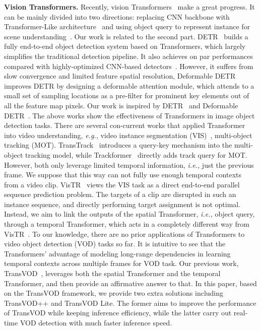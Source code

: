 \documentclass[10pt,journal,compsoc]{IEEEtran}
\begin{document}
\noindent
\textbf{Vision Transformers.} Recently, vision Transformers~\cite{detr,zhu2020deformable,liu2021swin, dosovitskiy2020image,sun2020transtrack,meinhardt2021trackformer} make a great progress. It can be mainly divided into two directions: replacing CNN backbone with Transformer-Like architecture~\cite{dosovitskiy2020image,liu2021swin,deit_vit,zhang2022eatformer} and using object query to represent instance for scene understanding~\cite{detr,zhu2020deformable,video_knet,panopticpartformer,fashionformer}. Our work is related to the second part. DETR~\cite{detr} builds a fully end-to-end object detection system based on Transformers, which largely simplifies the traditional detection pipeline. It also achieves on par performances compared with highly-optimized CNN-based detectors~\cite{ren2016faster}. However, it suffers from slow convergence and limited feature spatial resolution, Deformable DETR~\cite{zhu2020deformable} improves DETR by designing a deformable attention module, which attends to a small set of sampling locations as a pre-filter for prominent key elements out of all the feature map pixels. Our work is inspired by DETR~\cite{detr} and Deformable DETR~\cite{zhu2020deformable}. The above works show the effectiveness of Transformers in image object detection tasks. There are several con-current works that applied Transformer into video understanding, \emph{e.g.,} video instance segmentation (VIS)~\cite{vis_dataset}, multi-object tracking (MOT). TransTrack~\cite{sun2020transtrack} introduces a query-key mechanism into the multi-object tracking model, while Trackformer~\cite{meinhardt2021trackformer} directly adds track query for MOT. However, both only leverage limited temporal information, \emph{i.e.,} just the previous frame. We suppose that this way can not fully use enough temporal contexts from a video clip. VisTR~\cite{wang2020end} views the VIS task as a direct end-to-end parallel sequence prediction problem. The targets of a clip are disrupted in such an instance sequence, and directly performing target assignment is not optimal. Instead, we aim to link the outputs of the spatial Transformer, \emph{i.e.,} object query, through a temporal Transformer, which acts in a completely different way from VisTR~\cite{wang2020end}. To our knowledge, there are no prior applications of Transformers to video object detection (VOD) tasks so far. It is intuitive to see that the Transformers’ advantage of modeling long-range dependencies in learning temporal contexts across multiple frames for VOD task. Our previous work, TransVOD~\cite{he2021end}, leverages both the spatial Transformer and the temporal Transformer, and then provide an affirmative answer to that. In this paper, based on the TransVOD framework, we provide two extra solutions including TransVOD++ and TransVOD Lite. The former aims to improve the performance of TransVOD while keeping inference efficiency, while the latter carry out real-time VOD detection with much faster inference speed.
\end{document}
